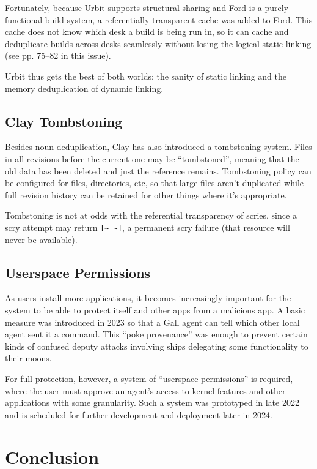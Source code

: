 \documentclass[twoside]{article}
\begin{document}
Fortunately, because Urbit supports structural sharing and Ford is a purely functional build system, a referentially transparent cache was added to Ford.  This cache does not know which desk a build is being run in, so it can cache and deduplicate builds across desks seamlessly without losing the logical static linking (see pp. 75–82 in this issue).

Urbit thus gets the best of both worlds: the sanity of static linking and the memory deduplication of dynamic linking.

\subsection{Clay Tombstoning}

Besides noun deduplication, Clay has also introduced a tombstoning system.  Files in all revisions before the current one may be ``tombstoned'', meaning that the old data has been deleted and just the reference remains.  Tombstoning policy can be configured for files, directories, etc, so that large files aren't duplicated while full revision history can be retained for other things where it's appropriate.

Tombstoning is not at odds with the referential transparency of scries, since a scry attempt may return \lstinline[style=inlinecode]{[~ ~]}, a permanent scry failure (that resource will never be available).

\subsection{Userspace Permissions}

As users install more applications, it becomes increasingly important for the system to be able to protect itself and other apps from a malicious app.  A basic measure was introduced in 2023 so that a Gall agent can tell which other local agent sent it a command.  This ``poke provenance'' was enough to prevent certain kinds of confused deputy attacks involving ships delegating some functionality to their moons.

For full protection, however, a system of ``userspace permissions'' is required, where the user must approve an agent's access to kernel features and other applications with some granularity.  Such a system was prototyped in late 2022 and is scheduled for further development and deployment later in 2024.

\section{Conclusion}
\end{document}
